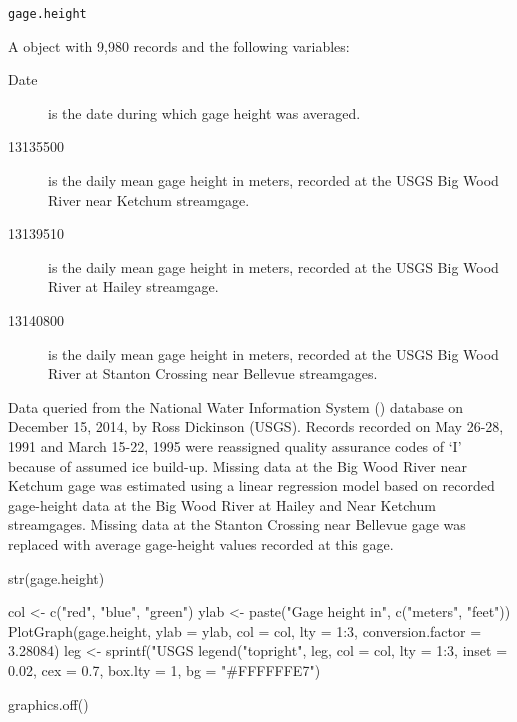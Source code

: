 \documentclass[letterpaper]{book}
\begin{document}
%
\begin{Usage}
\begin{verbatim}
gage.height
\end{verbatim}
\end{Usage}
%
\begin{Format}
A  object with 9,980 records and the following variables:
\begin{description}

\item[Date] is the date during which gage height was averaged.
\item[13135500] is the daily mean gage height in meters, recorded at the USGS  Big Wood River near Ketchum streamgage.
\item[13139510] is the daily mean gage height in meters, recorded at the USGS  Big Wood River at Hailey streamgage.
\item[13140800] is the daily mean gage height in meters, recorded at the USGS  Big Wood River at Stanton Crossing near Bellevue streamgages.

\end{description}

\end{Format}
%
\begin{Source}\relax
Data queried from the National Water Information System () database on December 15, 2014, by Ross Dickinson (USGS).
Records recorded on May 26-28, 1991 and March 15-22, 1995 were reassigned quality assurance codes of `I' because of assumed ice build-up.
Missing data at the Big Wood River near Ketchum gage was estimated using a linear regression model based on recorded gage-height data at the Big Wood River at Hailey and Near Ketchum streamgages.
Missing data at the Stanton Crossing near Bellevue gage was replaced with average gage-height values recorded at this gage.
\end{Source}
%
\begin{Examples}
\begin{ExampleCode}
str(gage.height)

col <- c("red", "blue", "green")
ylab <- paste("Gage height in", c("meters", "feet"))
PlotGraph(gage.height, ylab = ylab, col = col, lty = 1:3, conversion.factor = 3.28084)
leg <- sprintf("USGS %
legend("topright", leg, col = col, lty = 1:3, inset = 0.02, cex = 0.7,
       box.lty = 1, bg = "#FFFFFFE7")

graphics.off()
\end{ExampleCode}
\end{Examples}
\end{document}
